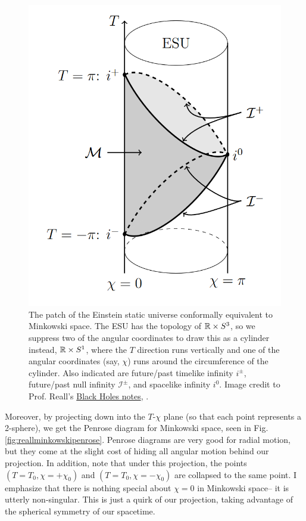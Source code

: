 \begin{figure}
    \centering
    \includegraphics{2019/02/20190222_reallesudiagram.png}
    \caption{The patch of the Einstein static universe conformally equivalent to Minkowski space. The ESU has the topology of $\mathbb{R}\times S^3$, so we suppress two of the angular coordinates to draw this as a cylinder instead, $\mathbb{R}\times S^1$, where the $T$ direction runs vertically and one of the angular coordinates (say, $\chi$) runs around the circumference of the cylinder. Also indicated are future/past timelike infinity $i^\pm$, future/past null infinity $\mathcal{I}^\pm$, and spacelike infinity $i^0$.
    \newline
    Image credit to Prof. Reall's  \href{http://www.damtp.cam.ac.uk/user/hsr1000/black_holes_lectures_2016.pdf}{Black Holes notes}, .
    }
    \label{fig:reallesudiagram}
\end{figure}
Moreover, by projecting down into the $T$-$\chi$ plane (so that each point represents a 2-sphere), we get the Penrose diagram for Minkowski space, seen in Fig. \ref{fig:reallminkowskipenrose}. Penrose diagrams are very good for radial motion, but they come at the slight cost of hiding all angular motion behind our projection. In addition, note that under this projection, the points $(T=T_0,\chi=+\chi_0)$ and $(T=T_0,\chi=-\chi_0)$ are collapsed to the same point. I emphasize that there is nothing special about $\chi=0$ in Minkowski space-- it is utterly non-singular. This is just a quirk of our projection, taking advantage of the spherical symmetry of our spacetime.

